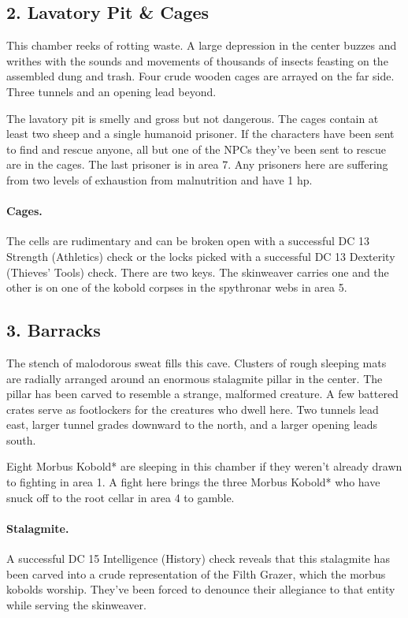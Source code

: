 \documentclass[10pt,a4paper,twoside,twocolumn,openany,bg=print,nodeprecatedcode]{dndbook}
\begin{document}
\subsection{2. Lavatory Pit \& Cages}
\begin{DndReadAloud}{}
This chamber reeks of rotting waste. A large depression in the center buzzes and writhes with the sounds and movements of thousands of insects feasting on the assembled dung and trash. Four crude wooden cages are arrayed on the far side. Three tunnels and an opening lead beyond.
\end{DndReadAloud}

The lavatory pit is smelly and gross but not dangerous. The cages contain at least two sheep and a single humanoid prisoner. If the characters have been sent to find and rescue anyone, all but one of the NPCs they've been sent to rescue are in the cages. The last prisoner is in area 7. Any prisoners here are suffering from two levels of exhaustion from malnutrition and have 1 hp.
\paragraph{Cages.}
The cells are rudimentary and can be broken open with a successful DC 13 Strength (Athletics) check or the locks picked with a successful DC 13 Dexterity (Thieves' Tools) check. There are two keys. The skinweaver carries one and the other is on one of the kobold corpses in the spythronar webs in area 5.
\subsection{3. Barracks}
\begin{DndReadAloud}{}
The stench of malodorous sweat fills this cave. Clusters of rough sleeping mats are radially arranged around an enormous stalagmite pillar in the center. The pillar has been carved to resemble a strange, malformed creature. A few battered crates serve as footlockers for the creatures who dwell here. Two tunnels lead east, larger tunnel grades downward to the north, and a larger opening leads south.
\end{DndReadAloud}

Eight Morbus Kobold* are sleeping in this chamber if they weren't already drawn to fighting in area 1. A fight here brings the three Morbus Kobold* who have snuck off to the root cellar in area 4 to gamble.
\paragraph{Stalagmite.}
A successful DC 15 Intelligence (History) check reveals that this stalagmite has been carved into a crude representation of the Filth Grazer, which the morbus kobolds worship. They've been forced to denounce their allegiance to that entity while serving the skinweaver.
\end{document}
